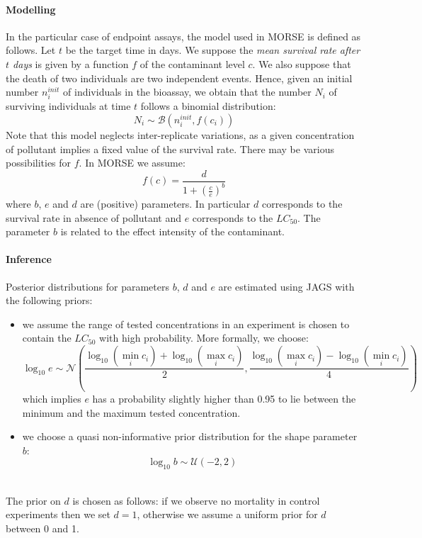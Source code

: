 \documentclass{article}
\begin{document}
\paragraph{Modelling} In the particular case of endpoint assays, the
model used in MORSE is defined as follows. Let $t$ be the target time
in days. We suppose the \emph{mean survival rate after $t$ days} is
given by a function $f$ of the contaminant level $c$. We also suppose
that the death of two individuals are two independent events. Hence,
given an initial number $n^{init}_i$ of individuals in the bioassay,
we obtain that the number $N_i$ of surviving individuals at time $t$
follows a binomial distribution:
$$
N_i \sim \mathcal{B}(n^{init}_i, f(c_i))
$$
Note that this model neglects inter-replicate variations, as a given
concentration of pollutant implies a fixed value of the survival
rate. There may be various possibilities for $f$. In MORSE we assume:
$$
f(c) = \frac{d}{1 + (\frac{c}{e})^b}
$$
where $b$, $e$ and $d$ are (positive) parameters. In particular $d$
corresponds to the survival rate in absence of pollutant and $e$
corresponds to the $LC_{50}$. The parameter $b$ is related to the
effect intensity of the contaminant.

\paragraph{Inference} Posterior distributions for parameters $b$,
$d$ and $e$ are estimated using JAGS with the following priors:
\begin{itemize}
\item we assume the range of tested concentrations in an
  experiment is chosen to contain the $LC_{50}$ with high
  probability. More formally, we choose:
  $$\log_{10} e \sim \mathcal{N}(\frac{\log_{10} (\min_i c_i) + \log_{10} (\max_i c_i)}{2}, \frac{\log_{10} (\max_i c_i) - \log_{10} (\min_i c_i)}{4})$$
  which implies $e$ has a probability slightly higher than 0.95 to lie
  between the minimum and the maximum tested concentration.
\item we choose a quasi non-informative prior distribution for the
  shape parameter $b$:
  $$\log_{10} b \sim \mathcal{U}(-2,2)$$
\end{itemize}

\begin{align*}
\end{align*}

The prior on $d$ is chosen as follows: if we observe
no mortality in control experiments then we set $d = 1$, otherwise we
assume a uniform prior for $d$ between 0 and 1.
\end{document}
